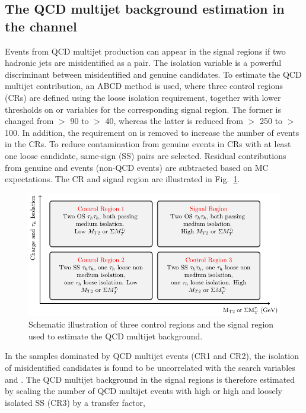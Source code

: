 \subsection{\texorpdfstring{The QCD multijet background estimation in the \tauTau channel}{The QCD multijet background estimation in the tau-tau channel}}
\label{sect:bkgQCD}
Events from QCD multijet production can appear in the signal regions if two hadronic jets are misidentified as a \tauTau pair.
The isolation variable is a powerful discriminant between misidentified and genuine \Tau candidates. To estimate the QCD multijet contribution, an ABCD method is used, where three \tauTau control regions (CRs) are defined using the loose \Tau isolation requirement, together with lower thresholds on \mttwo or \SumMT variables for the corresponding signal region. The former is changed from \mttwo $>$ 90 to $>$ 40\GeV, whereas the latter is reduced from \SumMT $>$ 250 to $>$ 100\GeV. In addition, the requirement on \deltaphi is removed to increase the number of events in the CRs. 
To reduce contamination from genuine \tauTau events 
in CRs with at least one loose \Tau candidate, 
same-sign (SS) \tauTau pairs are selected. Residual contributions from genuine 
\tauTau and \wjets events (non-QCD events) are subtracted based on MC expectations. 
The CR and signal region are illustrated in Fig.~\ref{fig:ABCDQCD}. 
\begin{figure}[!htb]
\centering
\includegraphics[angle=0,scale=1.15]{Bkg/ABCD.pdf}
\caption{Schematic illustration of three control regions and the signal region used to estimate the QCD multijet background.}
\label{fig:ABCDQCD}
\end{figure}
In the samples dominated by QCD multijet events (CR1 and CR2), the isolation of misidentified \Tau candidates is found 
to be uncorrelated with the search variables \mttwo and \SumMT.
The QCD multijet background in the signal regions is therefore estimated by scaling the number of QCD multijet events with high \mttwo or high \SumMT and loosely isolated SS \tauTau (CR3) by a transfer factor, 
